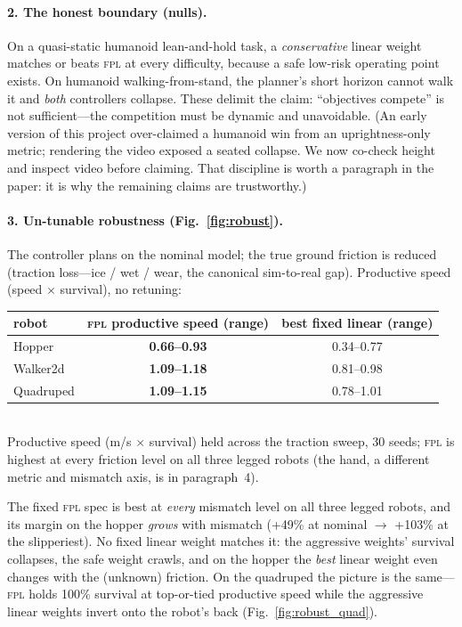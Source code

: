 \documentclass[11pt]{article}
\newcommand{\fpl}{\textsc{fpl}}
\begin{document}
\paragraph{2. The honest boundary (nulls).} On a quasi-static humanoid lean-and-hold task,
a \emph{conservative} linear weight matches or beats \fpl{} at every difficulty, because a safe
low-risk operating point exists. On humanoid walking-from-stand, the planner's short horizon
cannot walk it and \emph{both} controllers collapse. These delimit the claim: ``objectives
compete'' is not sufficient---the competition must be dynamic and unavoidable. (An early
version of this project over-claimed a humanoid win from an uprightness-only metric; rendering
the video exposed a seated collapse. We now co-check height and inspect video before claiming.
That discipline is worth a paragraph in the paper: it is why the remaining claims are trustworthy.)

\paragraph{3. Un-tunable robustness (Fig.~\ref{fig:robust}).} The controller plans on the
nominal model; the true ground friction is reduced (traction loss---ice / wet / wear, the
canonical sim-to-real gap). Productive speed (speed $\times$ survival), no retuning:

\begin{center}\small
\begin{tabular}{lcc}
\toprule
robot & \fpl{} productive speed (range) & best fixed linear (range) \\
\midrule
Hopper       & \textbf{0.66--0.93} & 0.34--0.77 \\
Walker2d     & \textbf{1.09--1.18} & 0.81--0.98 \\
Quadruped    & \textbf{1.09--1.15} & 0.78--1.01 \\
\bottomrule
\end{tabular}\\[2pt]
{\footnotesize Productive speed (m/s $\times$ survival) held across the traction sweep, 30
seeds; \fpl{} is highest at every friction level on all three legged robots (the hand, a
different metric and mismatch axis, is in paragraph~4).}
\end{center}

\noindent The fixed \fpl{} spec is best at \emph{every} mismatch level on all three legged
robots, and its margin on the hopper \emph{grows} with mismatch (+49\% at nominal $\to$ +103\%
at the slipperiest). No fixed linear weight matches it: the
aggressive weights' survival collapses, the safe weight crawls, and on the hopper the
\emph{best} linear weight even changes with the (unknown) friction. On the quadruped the
picture is the same---\fpl{} holds 100\% survival at top-or-tied productive speed while the
aggressive linear weights invert onto the robot's back (Fig.~\ref{fig:robust_quad}).
\end{document}
